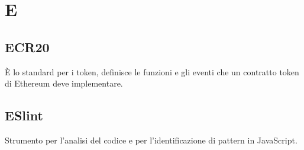 \section*{E}
\subsection*{ECR20}
\`E lo standard per i token, definisce le funzioni e gli eventi che un contratto token di Ethereum deve implementare.


\subsection*{ESlint
}
Strumento per l’analisi del codice e per l’identificazione di pattern in JavaScript.
















